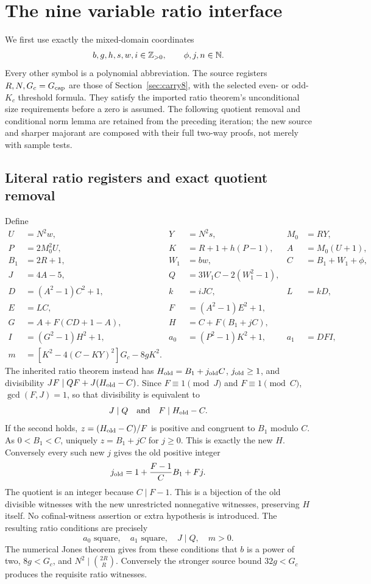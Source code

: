 \section{The nine variable ratio interface}
We first use exactly the mixed-domain coordinates
\[
 b,g,h,s,w,i\in\mathbb Z_{>0},\qquad \phi,j,n\in\mathbb N.
\]
Every other symbol is a polynomial abbreviation. The source registers
$R,N,G_c=G_{\rm cap}$ are those of Section~\ref{sec:carry8}, with the
selected even- or odd-$K_c$ threshold formula. They satisfy the imported
ratio theorem's unconditional size requirements before a zero is assumed.
The following quotient removal and conditional norm lemma are retained
from the preceding iteration; the new source and sharper majorant are
composed with their full two-way proofs, not merely with sample tests.

\subsection{Literal ratio registers and exact quotient removal}
Define
\begin{align*}
 U&=N^2w,&Y&=N^2s,&M_0&=RY,\\
 P&=2M_0^2U,&K&=R+1+h(P-1),&A&=M_0(U+1),\\
 B_1&=2R+1,&W_1&=bw,&C&=B_1+W_1+\phi,\\
 J&=4A-5,&Q&=3W_1C-2(W_1^2-1),&&\\
 D&=(A^2-1)C^2+1,&k&=iJC,&L&=kD,\\
 E&=LC,&F&=(A^2-1)E^2+1,&&\\
 G&=A+F(CD+1-A),&H&=C+F(B_1+jC),&&\\
 I&=(G^2-1)H^2+1,&a_0&=(P^2-1)K^2+1,&a_1&=DFI,\\
 m&=[K^2-4(C-KY)^2]G_c-8gK^2.&&&&
\end{align*}
The inherited ratio theorem instead has $H_{\rm old}=B_1+j_{\rm old}C$,
$j_{\rm old}\ge1$, and divisibility
$JF\mid QF+J(H_{\rm old}-C)$. Since $F\equiv1\pmod J$ and
$F\equiv1\pmod C$, $\gcd(F,J)=1$, so that divisibility is equivalent to
\[
 J\mid Q\quad\hbox{and}\quad F\mid H_{\rm old}-C.
\]
If the second holds, $z=(H_{\rm old}-C)/F$ is positive and congruent to
$B_1$ modulo $C$. As $0<B_1<C$, uniquely $z=B_1+jC$ for $j\ge0$.
This is exactly the new $H$. Conversely every such new $j$ gives the old
positive integer
\[
 j_{\rm old}=1+\frac{F-1}{C}B_1+Fj.
\]
The quotient is an integer because $C\mid F-1$. This is a bijection of the
old divisible witnesses with the new unrestricted nonnegative witnesses,
preserving $H$ itself. No cofinal-witness assertion or extra hypothesis is
introduced. The resulting ratio conditions are precisely
\[
 a_0\text{ square},\quad a_1\text{ square},\quad J\mid Q,\quad m>0.
\]
The numerical Jones theorem gives from these conditions that $b$ is a power
of two, $8g<G_c$, and $N^2\mid\binom{2R}{R}$. Conversely the stronger
source bound $32g<G_c$ produces the requisite ratio witnesses.

